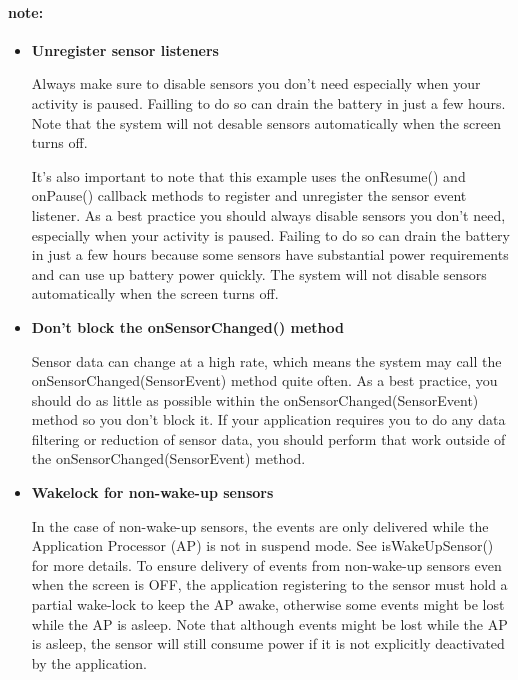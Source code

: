 \documentclass{article}
\begin{document}
{
  \small
  \paragraph{note:}
  \begin{itemize}

\item 
\textbf{Unregister sensor listeners}

  Always make sure to disable sensors you don't need especially when your
  activity is paused. Failling to do so can drain the battery in just a few hours.
  Note that the system will not desable sensors automatically when the screen
  turns off.

  It's also important to note that this example uses the onResume() and onPause()
  callback methods to register and unregister the sensor event listener. As a best
  practice you should always disable sensors you don't need, especially when your
  activity is paused. Failing to do so can drain the battery in just a few hours
  because some sensors have substantial power requirements and can use up battery
  power quickly. The system will not disable sensors automatically when the screen
  turns off.
  
\item 
\textbf{Don't block the onSensorChanged() method}

  Sensor data can change at a high rate, which means the system may call the
  onSensorChanged(SensorEvent) method quite often. As a best practice, you should
  do as little as possible within the onSensorChanged(SensorEvent) method so you
  don't block it. If your application requires you to do any data filtering or
  reduction of sensor data, you should perform that work outside of the
  onSensorChanged(SensorEvent) method.

\item 
  \textbf{Wakelock for non-wake-up sensors}

  In the case of non-wake-up sensors, the events are only delivered while the
  Application Processor (AP) is not in suspend mode. See isWakeUpSensor() for more
  details. To ensure delivery of events from non-wake-up sensors even when the
  screen is OFF, the application registering to the sensor must hold a partial
  wake-lock to keep the AP awake, otherwise some events might be lost while the AP
  is asleep. Note that although events might be lost while the AP is asleep, the
  sensor will still consume power if it is not explicitly deactivated by the
  application.

  \end{itemize}
}
\end{document}
